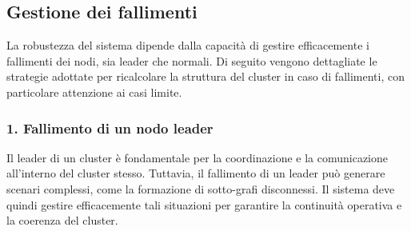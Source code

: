 \documentclass[12pt, a4paper]{report}
\begin{document}
\subsection{Gestione dei fallimenti}

La robustezza del sistema dipende dalla capacit\`a di gestire efficacemente i fallimenti dei nodi, sia leader che normali. Di seguito vengono dettagliate le strategie adottate per ricalcolare la struttura del cluster in caso di fallimenti, con particolare attenzione ai casi limite.

\subsubsection{1. Fallimento di un nodo leader}
\label{sec:fallimento_leader}
Il leader di un cluster \`e fondamentale per la coordinazione e la comunicazione all'interno del cluster stesso. Tuttavia, il fallimento di un leader pu\`o generare scenari complessi, come la formazione di sotto-grafi disconnessi. Il sistema deve quindi gestire efficacemente tali situazioni per garantire la continuit\`a operativa e la coerenza del cluster.
\end{document}
